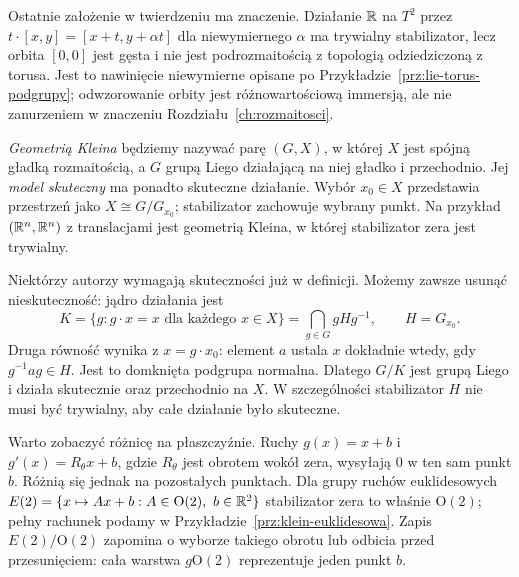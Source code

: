 Ostatnie założenie w twierdzeniu ma znaczenie. Działanie
$\mathbb{R}$ na $T^2$ przez
$t\cdot[x,y]=[x+t,y+\alpha t]$ dla niewymiernego $\alpha$
ma trywialny stabilizator, lecz orbita $[0,0]$ jest gęsta
i nie jest podrozmaitością z topologią odziedziczoną z torusa.
Jest to nawinięcie niewymierne opisane po
Przykładzie~\ref{prz:lie-torus-podgrupy}; odwzorowanie orbity jest
różnowartościową immersją, ale nie zanurzeniem w znaczeniu
Rozdziału~\ref{ch:rozmaitosci}.

\begin{definicja}
\label{def:klein-geometria}
\emph{Geometrią Kleina} będziemy nazywać parę $(G,X)$, w której
$X$ jest spójną gładką rozmaitością, a $G$ grupą Liego działającą
na niej gładko i przechodnio. Jej \emph{model skuteczny} ma ponadto
skuteczne działanie. Wybór $x_0\in X$ przedstawia przestrzeń jako
$X\cong G/G_{x_0}$; stabilizator zachowuje wybrany punkt.
Na przykład $(\mathbb{R}^n,\mathbb{R}^n)$ z translacjami jest geometrią Kleina,
w której stabilizator zera jest trywialny.
\end{definicja}

Niektórzy autorzy wymagają skuteczności już w definicji. Możemy
zawsze usunąć nieskuteczność: jądro działania jest
\begin{equation}\label{eq:klein-jadro}
 K=\{g:g\cdot x=x\text{ dla każdego }x\in X\}
   =\bigcap_{g\in G}gHg^{-1},\qquad H=G_{x_0}.
\end{equation}
Druga równość wynika z $x=g\cdot x_0$: element $a$ ustala
$x$ dokładnie wtedy, gdy $g^{-1}ag\in H$. Jest to domknięta
podgrupa normalna. Dlatego $G/K$ jest grupą Liego i działa
skutecznie oraz przechodnio na $X$. W szczególności stabilizator
$H$ nie musi być trywialny, aby całe działanie było skuteczne.

Warto zobaczyć różnicę na płaszczyźnie.
Ruchy $g(x)=x+b$ i $g'(x)=R_\theta x+b$, gdzie $R_\theta$
jest obrotem wokół zera, wysyłają $0$ w ten sam punkt $b$.
Różnią się jednak na pozostałych punktach.
Dla grupy ruchów euklidesowych
$E(2)=\{x\mapsto Ax+b:A\in\mathrm O(2),\ b\in\mathbb{R}^2\}$
stabilizator zera to właśnie $\mathrm O(2)$;
pełny rachunek podamy w Przykładzie~\ref{prz:klein-euklidesowa}.
Zapis $E(2)/\mathrm O(2)$ zapomina o wyborze
takiego obrotu lub odbicia przed przesunięciem:
cała warstwa $g\mathrm O(2)$ reprezentuje jeden punkt $b$.

